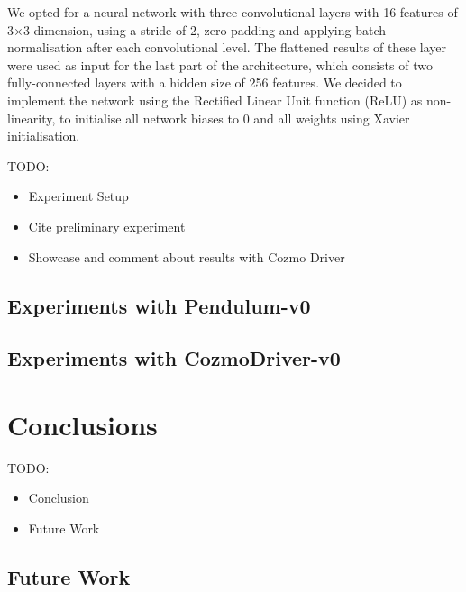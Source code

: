 \documentclass[10pt,twocolumn,letterpaper]{article}
\begin{document}
We opted for a neural network with three convolutional layers with 16 features of 3$\times$3 dimension, using a stride of 2, zero padding and applying batch normalisation after each convolutional level.
The flattened results of these layer were used as input for the last part of the architecture, which consists of two fully-connected layers with a hidden size of 256 features.
We decided to implement the network using the Rectified Linear Unit function (ReLU) as non-linearity, to initialise all network biases to 0 and all weights using Xavier initialisation.

TODO:

\begin{itemize}
    \item Experiment Setup
    \item Cite preliminary experiment
    \item Showcase and comment about results with Cozmo Driver
\end{itemize}

\subsection{Experiments with Pendulum-v0}

\subsection{Experiments with CozmoDriver-v0}

\section{Conclusions}

TODO:
\begin{itemize}
    \item Conclusion
    \item Future Work
\end{itemize}

\subsection{Future Work}


{\small
    
    
}
\end{document}
